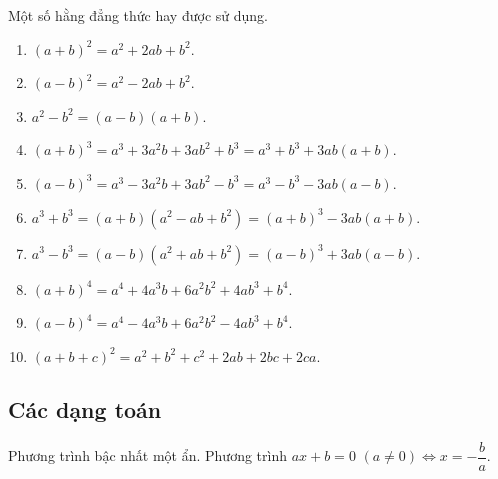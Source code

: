 \begin{tc} Một số hằng đẳng thức hay được sử dụng.

\begin{enumerate}[1)]
\item $(a+b)^2=a^2+2ab+b^2$.
\item $(a-b)^2=a^2-2ab+b^2$.
\item $a^2-b^2=(a-b)(a+b)$.
\item $(a+b)^3=a^3+3a^2b+3ab^2+b^3=a^3+b^3+3ab(a+b)$.
\item $(a-b)^3=a^3-3a^2b+3ab^2-b^3=a^3-b^3-3ab(a-b)$.
\item $a^3+b^3=(a+b)(a^2-ab+b^2)=(a+b)^3-3ab(a+b)$.
\item $a^3-b^3=(a-b)(a^2+ab+b^2)=(a-b)^3+3ab(a-b)$.
\item $(a+b)^4=a^4+4a^3b+6a^2b^2+4ab^3+b^4$.
\item $(a-b)^4=a^4-4a^3b+6a^2b^2-4ab^3+b^4$.
\item $(a+b+c)^2=a^2+b^2+c^2+2ab+2bc+2ca.$
\end{enumerate}

\end{tc}

\subsection{Các dạng toán}

\begin{dang}{Phương trình bậc nhất một ẩn.}
    Phương trình $ax+b=0\,\,  (a\neq 0) \Leftrightarrow x= -\dfrac{b}{a}$.
\end{dang}

